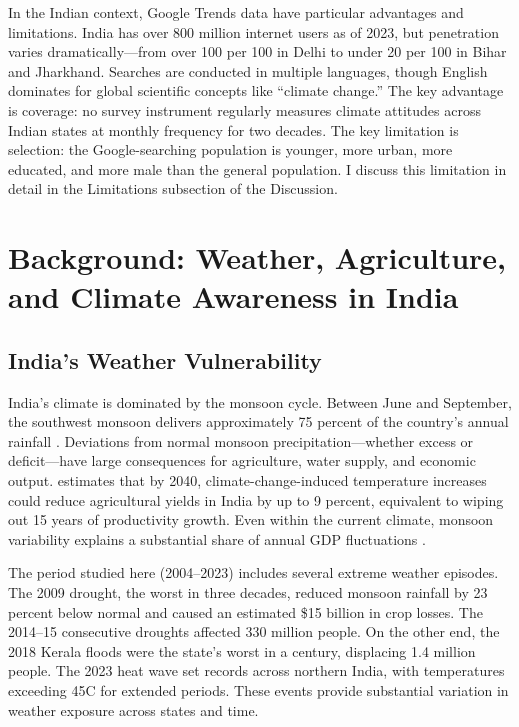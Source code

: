 \documentclass[12pt]{article}
\begin{document}
In the Indian context, Google Trends data have particular advantages and limitations. India has over 800 million internet users as of 2023, but penetration varies dramatically---from over 100 per 100 in Delhi to under 20 per 100 in Bihar and Jharkhand. Searches are conducted in multiple languages, though English dominates for global scientific concepts like ``climate change.'' The key advantage is coverage: no survey instrument regularly measures climate attitudes across Indian states at monthly frequency for two decades. The key limitation is selection: the Google-searching population is younger, more urban, more educated, and more male than the general population. I discuss this limitation in detail in the Limitations subsection of the Discussion.

\section{Background: Weather, Agriculture, and Climate Awareness in India}

\subsection{India's Weather Vulnerability}

India's climate is dominated by the monsoon cycle. Between June and September, the southwest monsoon delivers approximately 75 percent of the country's annual rainfall \citep{gadgil2006}. Deviations from normal monsoon precipitation---whether excess or deficit---have large consequences for agriculture, water supply, and economic output. \citet{guiteras2009} estimates that by 2040, climate-change-induced temperature increases could reduce agricultural yields in India by up to 9 percent, equivalent to wiping out 15 years of productivity growth. Even within the current climate, monsoon variability explains a substantial share of annual GDP fluctuations \citep{gadgiletalijoc}.

The period studied here (2004--2023) includes several extreme weather episodes. The 2009 drought, the worst in three decades, reduced monsoon rainfall by 23 percent below normal and caused an estimated \$15 billion in crop losses. The 2014--15 consecutive droughts affected 330 million people. On the other end, the 2018 Kerala floods were the state's worst in a century, displacing 1.4 million people. The 2023 heat wave set records across northern India, with temperatures exceeding 45\degree C for extended periods. These events provide substantial variation in weather exposure across states and time.
\end{document}
